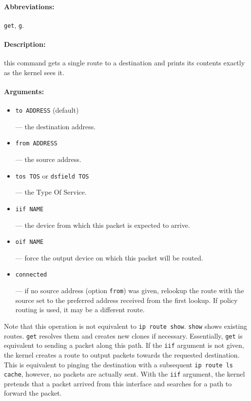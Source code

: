 \paragraph{Abbreviations:} \verb|get|, \verb|g|.

\paragraph{Description:} this command gets a single route to a destination
and prints its contents exactly as the kernel sees it.

\paragraph{Arguments:} 
\begin{itemize}
\item \verb|to ADDRESS| (default)

--- the destination address.

\item \verb|from ADDRESS|

--- the source address.

\item \verb|tos TOS| or \verb|dsfield TOS|

--- the Type Of Service.

\item \verb|iif NAME|

--- the device from which this packet is expected to arrive.

\item \verb|oif NAME|

--- force the output device on which this packet will be routed.

\item \verb|connected|

--- if no source address (option \verb|from|) was given, relookup
the route with the source set to the preferred address received from the first lookup.
If policy routing is used, it may be a different route.

\end{itemize}

Note that this operation is not equivalent to \verb|ip route show|.
\verb|show| shows existing routes. \verb|get| resolves them and
creates new clones if necessary. Essentially, \verb|get|
is equivalent to sending a packet along this path.
If the \verb|iif| argument is not given, the kernel creates a route
to output packets towards the requested destination.
This is equivalent to pinging the destination
with a subsequent {\tt ip route ls cache}, however, no packets are
actually sent. With the \verb|iif| argument, the kernel pretends
that a packet arrived from this interface and searches for
a path to forward the packet.

